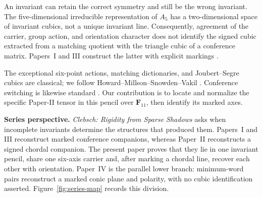 \documentclass[11pt]{article}
\theoremstyle{definition}
\theoremstyle{remark}
\newcommand{\F}{\mathbf F}
\begin{document}
An invariant can retain the correct symmetry and still be the wrong
invariant.  The five-dimensional
irreducible representation of \(A_5\) has a two-dimensional space of
invariant cubics, not a unique invariant line.
Consequently, agreement of the carrier, group action, and orientation
character does not identify the signed cubic extracted from a matching
quotient with the triangle cubic of a conference matrix.  Papers~I and III
construct the latter with explicit markings
\cite{RuddRigidity2026,RuddPassages2026}.

The exceptional six-point actions, matching dictionaries, and
Joubert--Segre cubics are classical; we follow
Howard--Millson--Snowden--Vakil
\cite[\S\S1.1--1.6 and 2.1--2.4]{HMSVOuter}.  Conference switching is likewise
standard \cite[\S\S1--3]{GoethalsSeidel1967}.  Our contribution is to locate
and normalize the specific Paper-II tensor in this pencil over \(\F_{11}\),
then identify its marked axes.

\medskip
\noindent\textbf{Series perspective.}
\emph{Clebsch: Rigidity from Sparse Shadows} asks when incomplete invariants
determine the structures that produced them.  Papers~I and III reconstruct
marked conference companions, whereas Paper~II reconstructs a signed chordal
companion.  The present paper proves that they lie in one invariant pencil,
share one six-axis carrier and, after marking a chordal line, recover each
other with orientation.  Paper~IV is the parallel lower branch:
minimum-word pairs reconstruct a marked conic plane and polarity, with no
cubic identification asserted.  Figure~\ref{fig:series-map} records this
division.
\end{document}
